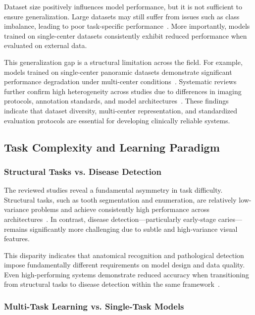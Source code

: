 \documentclass[conference]{IEEEtran}
\begin{document}
Dataset size positively influences model performance, but it is not sufficient to ensure generalization. Large datasets may still suffer from issues such as class imbalance, leading to poor task-specific performance~\cite{kaushik2025densenet201}. More importantly, models trained on single-center datasets consistently exhibit reduced performance when evaluated on external data.

This generalization gap is a structural limitation across the field. For example, models trained on single-center panoramic datasets demonstrate significant performance degradation under multi-center conditions~\cite{muresanu2024automating}. Systematic reviews further confirm high heterogeneity across studies due to differences in imaging protocols, annotation standards, and model architectures~\cite{khubrani2025detection}. These findings indicate that dataset diversity, multi-center representation, and standardized evaluation protocols are essential for developing clinically reliable systems.

\subsection{Task Complexity and Learning Paradigm}

\subsubsection{Structural Tasks vs. Disease Detection}

The reviewed studies reveal a fundamental asymmetry in task difficulty. Structural tasks, such as tooth segmentation and enumeration, are relatively low-variance problems and achieve consistently high performance across architectures~\cite{bonfanti2025deep}. In contrast, disease detection—particularly early-stage caries—remains significantly more challenging due to subtle and high-variance visual features.

This disparity indicates that anatomical recognition and pathological detection impose fundamentally different requirements on model design and data quality. Even high-performing systems demonstrate reduced accuracy when transitioning from structural tasks to disease detection within the same framework~\cite{nassiri2025yolo}.

\subsubsection{Multi-Task Learning vs. Single-Task Models}
\end{document}
